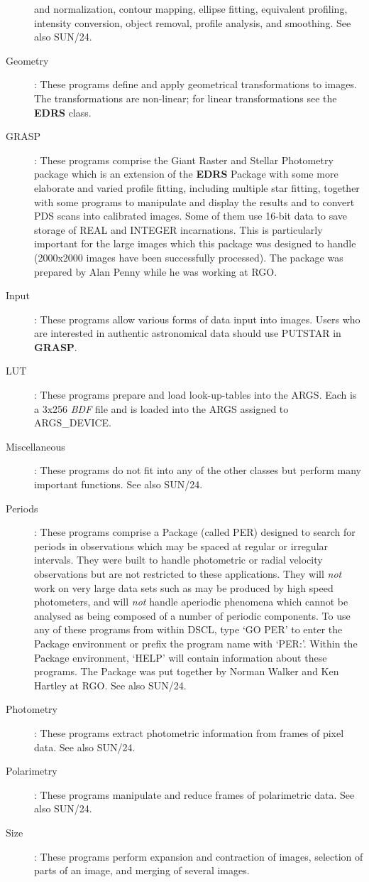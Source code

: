 \begin{description}
and normalization, contour mapping, ellipse fitting, equivalent profiling,
intensity conversion, object removal, profile analysis, and smoothing.
See also SUN/24.
\item [Geometry]:
These programs define and apply geometrical transformations to images.
The transformations are non-linear; for linear transformations see the
{\bf EDRS} class.
\item [GRASP]:
These programs comprise the Giant Raster and Stellar Photometry package which
is an extension of the {\bf EDRS} Package with some more elaborate and varied
profile fitting, including multiple star fitting, together with some programs to
manipulate and display the results and to convert PDS scans into calibrated
images.
Some of them use 16-bit data to save storage of REAL and INTEGER incarnations.
This is particularly important for the large images which this package was
designed to handle (2000x2000 images have been successfully processed).
The package was prepared by Alan Penny while he was working at RGO.
\item [Input]:
These programs allow various forms of data input into images.
Users who are interested in authentic astronomical data should use PUTSTAR in
{\bf GRASP}.
\item [LUT]:
These programs prepare and load look-up-tables into the ARGS.
Each is a 3x256 {\em BDF} file and is loaded into the ARGS assigned to
ARGS\_DEVICE.
\item [Miscellaneous]:
These programs do not fit into any of the other classes but perform many
important functions.
See also SUN/24.
\item [Periods]:
These programs comprise a Package (called PER) designed to search for periods in
observations which may be spaced at regular or irregular intervals.
They were built to handle photometric or radial velocity observations but are
not restricted to these applications.
They will {\em not} work on very large data sets such as may be produced by
high speed photometers, and will {\em not} handle aperiodic phenomena which
cannot be analysed as being composed of a number of periodic components.
To use any of these programs from within DSCL, type `GO PER' to enter the
Package environment or prefix the program name with `PER:'.
Within the Package environment, `HELP' will contain information about these
programs.
The Package was put together by Norman Walker and Ken Hartley at RGO.
See also SUN/24.
\item [Photometry]:
These programs extract photometric information from frames of pixel data.
See also SUN/24.
\item [Polarimetry]:
These programs manipulate and reduce frames of polarimetric data.
See also SUN/24.
\item [Size]:
These programs perform expansion and contraction of images, selection of parts
of an image, and merging of several images.
\end{description}
